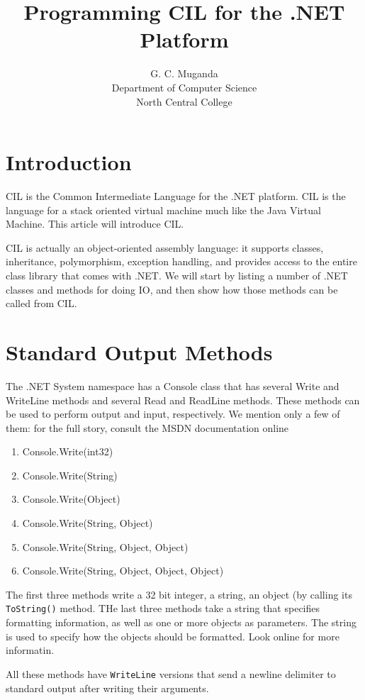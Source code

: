 \documentclass[10pt,a4paper]{amsart}
\author{G. C. Muganda\\Department of Computer Science\\North Central College}
\title{Programming CIL for the .NET Platform}
\begin{document}
\maketitle
\setlength{\parskip}{0.2cm}
\setlength{\parindent}{0pt}

\section{Introduction}
CIL is the Common Intermediate Language for the .NET platform. CIL is the language for a stack oriented virtual machine much like the Java Virtual Machine. This article will introduce CIL.

CIL is actually an object-oriented assembly language: it supports  classes, inheritance, polymorphism, 
exception handling, and provides access to the entire class library that comes with .NET. We will start 
by listing a number of .NET classes and methods for doing IO, and then show how those methods can 
be called from CIL.

\section{Standard Output Methods}
The .NET System namespace has a Console class that has several Write and WriteLine methods and several 
Read and ReadLine methods. These methods can be used to perform output and input, respectively.
We mention only a few of them: for the full story, consult the MSDN documentation online
\begin{enumerate}
\item  Console.Write(int32)
\item Console.Write(String)
\item Console.Write(Object)
\item Console.Write(String, Object)
\item Console.Write(String, Object, Object)
\item Console.Write(String, Object, Object, Object)
\end{enumerate}
The first three methods write a 32 bit integer, a string, an object (by calling its {\tt ToString()} method.
THe last three methods take a string that specifies formatting information, as well as one or more objects as parameters. The string is used to specify how the objects should be formatted. Look online for more informatin.

All these methods have {\tt WriteLine} versions that send a newline delimiter to standard output after 
writing their arguments.
\end{document}
